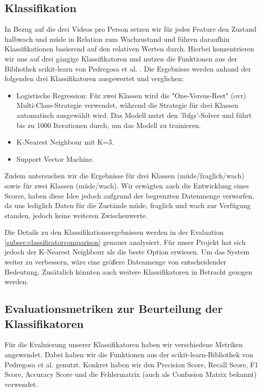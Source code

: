 \subsection{Klassifikation}
\label{sec:classification}

In Bezug auf die drei Videos pro Person setzen wir für jedes Feature den Zustand halbwach und müde in Relation zum Wachzustand und führen daraufhin Klassifikationen basierend auf den relativen Werten durch. Hierbei konzentrieren wir uns auf drei gängige Klassifikatoren und nutzen die Funktionen aus der Bibliothek scikit-learn von Pedregosa et al. \cite{PE11}. Die Ergebnisse werden anhand der folgenden drei Klassifikatoren ausgewertet und verglichen:

\begin{itemize}
\item Logistische Regression: Für zwei Klassen wird die "One-Versus-Rest" (ovr) Multi-Class-Strategie verwendet, während die Strategie für drei Klassen automatisch ausgewählt wird. Das Modell nutzt den 'lbfgs'-Solver und führt bis zu 1000 Iterationen durch, um das Modell zu trainieren.
\item K-Nearest Neighbour mit K=3.
\item Support Vector Machine.
\end{itemize}

Zudem untersuchen wir die Ergebnisse für drei Klassen (müde/fraglich/wach) sowie für zwei Klassen (müde/wach). Wir erwägten auch die Entwicklung eines Scores, haben diese Idee jedoch aufgrund der begrenzten Datenmenge verworfen, da uns lediglich Daten für die Zustände müde, fraglich und wach zur Verfügung standen, jedoch keine weiteren Zwischenwerte.

Die Details zu den Klassifikationsergebnissen werden in der Evaluation \ref{subsec:classificatorcomparison} genauer analysiert. Für unser Projekt hat sich jedoch der K-Nearest Neighbour als die beste Option erwiesen. Um das System weiter zu verbessern, wäre eine größere Datenmenge von entscheidender Bedeutung. Zusätzlich könnten auch weitere Klassifikatoren in Betracht gezogen werden.

\subsection{Evaluationsmetriken zur Beurteilung der Klassifikatoren}
\label{sec:classificationmetrics}

Für die Evaluierung unserer Klassifikatoren haben wir verschiedene Metriken angewendet. Dabei haben wir die Funktionen aus der scikit-learn-Bibliothek von Pedregosa et al. \cite{PE11} genutzt. Konkret haben wir den Precision Score, Recall Score, F1 Score, Accuracy Score und die Fehlermatrix (auch als Confusion Matrix bekannt) verwendet.

